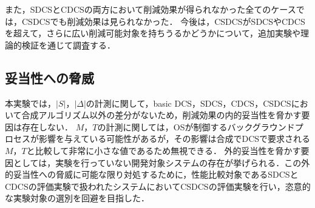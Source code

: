 また，SDCSとCDCSの両方において削減効果が得られなかった全てのケースでは，CSDCSでも削減効果は見られなかった．
今後は，CSDCSがSDCSやCDCSを超えて，さらに広い削減可能対象を持ちうるかどうかについて，追加実験や理論的検証を通じて調査する．

\subsection{妥当性への脅威}
本実験では，$|S|$，$|\Delta|$の計測に関して，basic DCS，SDCS，CDCS，CSDCSにおいて合成アルゴリズム以外の差分がないため，削減効果の内的妥当性を脅かす要因は存在しない．
$M$，$T$の計測に関しては，OSが制御するバックグラウンドプロセスが影響を与えている可能性があるが，その影響は合成でDCSで要求される$M$，$T$と比較して非常に小さな値であるため無視できる．
外的妥当性を脅かす要因としては，実験を行っていない開発対象システムの存在が挙げられる．この外的妥当性への脅威に可能な限り対処するために，性能比較対象であるSDCSとCDCSの評価実験で扱われたシステムにおいてCSDCSの評価実験を行い，恣意的な実験対象の選別を回避を目指した．






